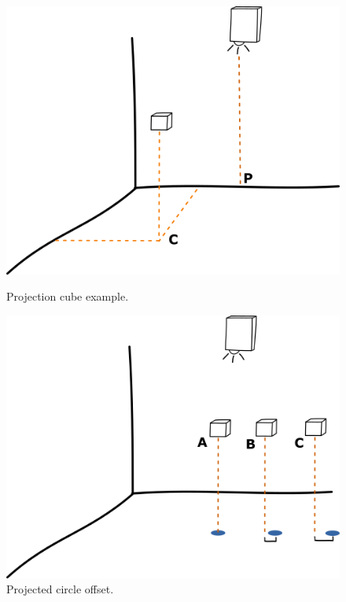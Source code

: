 \begin{figure}[!t]
  \centering
  \includegraphics[width=\linewidth]{imgs/impl/projection1}
    \caption{Projection cube example.}
    \label{fig:projection1}
    \endminipage\hfill
{}
  \centering
  \includegraphics[width=\linewidth]{imgs/impl/projection2}
    \caption{Projected circle offset.}
    \label{fig:projection2}
    \endminipage
\end{figure}



